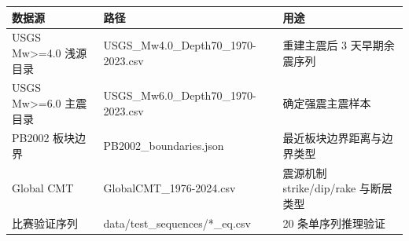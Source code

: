 \begingroup
\footnotesize
\setlength{\tabcolsep}{4pt}
\begin{tabular}{p{}p{}p{}}
\toprule
数据源 & 路径 & 用途 \\
\midrule
USGS Mw>=4.0 浅源目录 & USGS\_Mw4.0\_Depth70\_1970-2023.csv & 重建主震后 3 天早期余震序列 \\
USGS Mw>=6.0 主震目录 & USGS\_Mw6.0\_Depth70\_1970-2023.csv & 确定强震主震样本 \\
PB2002 板块边界 & PB2002\_boundaries.json & 最近板块边界距离与边界类型 \\
Global CMT & GlobalCMT\_1976-2024.csv & 震源机制 strike/dip/rake 与断层类型 \\
比赛验证序列 & data/test\_sequences/*\_eq.csv & 20 条单序列推理验证 \\
\bottomrule
\end{tabular}
\endgroup
